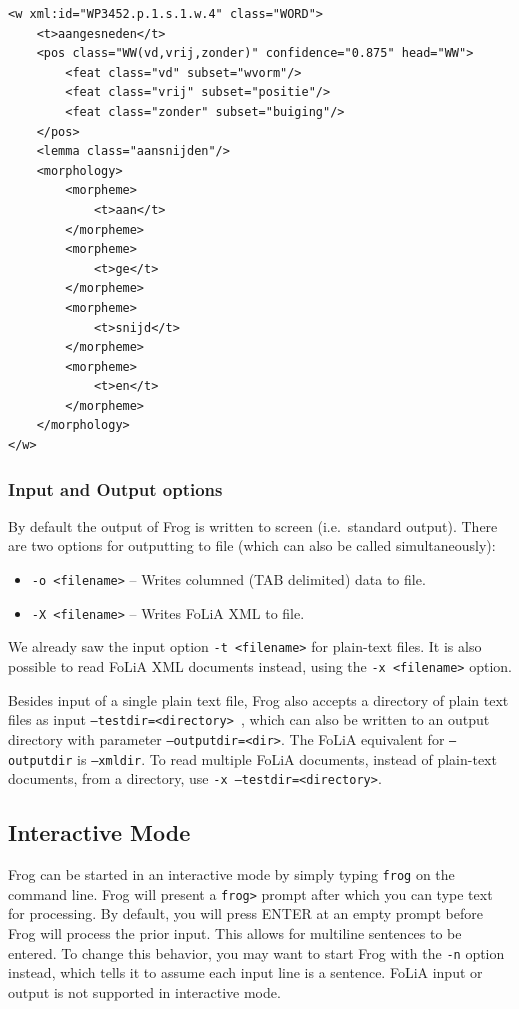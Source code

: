 \documentclass{book}
\begin{document}
\begin{example}
\label{ex-xml-tok}
\begin{verbatim}
<w xml:id="WP3452.p.1.s.1.w.4" class="WORD">
    <t>aangesneden</t>
    <pos class="WW(vd,vrij,zonder)" confidence="0.875" head="WW">
        <feat class="vd" subset="wvorm"/>
        <feat class="vrij" subset="positie"/>
        <feat class="zonder" subset="buiging"/>
    </pos>
    <lemma class="aansnijden"/>
    <morphology>
        <morpheme>
            <t>aan</t>
        </morpheme>
        <morpheme>
            <t>ge</t>
        </morpheme>
        <morpheme>
            <t>snijd</t>
        </morpheme>
        <morpheme>
            <t>en</t>
        </morpheme>
    </morphology>
</w>
\end{verbatim}
\end{example}

\subsubsection{Input and Output options}

By default the output of Frog is written to screen (i.e.\ standard output).
There are two options for outputting to file (which can also be called simultaneously):

\begin{itemize}
    \item \texttt{-o <filename>} -- Writes columned (TAB delimited) data to file.
    \item \texttt{-X <filename>} -- Writes FoLiA XML to file.
\end{itemize}

We already saw the input option {\tt -t <filename>} for plain-text files. It is
also possible to read FoLiA XML documents instead, using the {\tt -x
<filename>} option.

Besides input of a single plain text file, Frog also accepts a directory of
plain text files as input {\tt  --testdir=<directory> }, which can also be
written to an output directory with parameter {\tt --outputdir=<dir>}. The
FoLiA equivalent for {\tt --outputdir} is {\tt --xmldir}. To read multiple
FoLiA documents, instead of plain-text documents, from a directory, use {\tt -x
--testdir=<directory>}.


\subsection{Interactive Mode}

Frog can be started in an interactive mode by simply typing \texttt{frog} on the command
line. Frog will present a \texttt{frog>} prompt after which you can type text
for processing. By default, you will press ENTER at an empty prompt before Frog
will process the prior input. This allows for multiline sentences to be entered.
To change this behavior, you may want to start
Frog with the {\tt -n} option instead, which tells it to assume each input line
is a sentence. FoLiA input or output is not supported in interactive mode.
\end{document}
